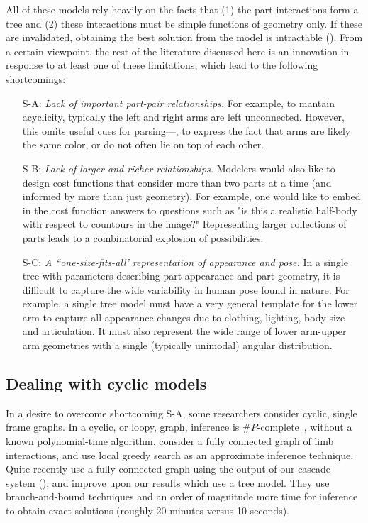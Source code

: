 All of these models rely heavily on the facts that (1) the part interactions 
form a tree and (2) these interactions must be simple functions of geometry 
only.  If these are invalidated, obtaining the best solution from the model is 
intractable ().   From a certain viewpoint, the rest of the 
literature discussed here is an innovation in response to at least one of these 
limitations, which lead to the following shortcomings:

\begin{itemize}
\item[S-A:] {\em Lack of important part-pair relationships.} For example, to 
mantain acyclicity, typically the left and right arms are left unconnected.  
However, this omits useful cues for parsing---\eg, to express the fact that 
arms are likely the same color, or do not often lie on top of each other.  

\item[S-B:] {\em Lack of larger and richer relationships.}  Modelers would also 
like to design cost functions that consider more than two parts at a time (and 
informed by more than just geometry).  For example, one would like to embed in 
the cost function answers to questions such as "is this a realistic half-body 
with respect to countours in the image?"  Representing larger collections of 
parts \naively leads to a combinatorial explosion of possibilities.

\item[S-C:] {\em A ``one-size-fits-all' representation of appearance and pose.} 
In a single tree with parameters describing part appearance and part geometry, 
it is difficult to capture the wide variability in human pose found in nature.  
For example, a single tree model must have a very general template for the 
lower arm to capture all appearance changes due to clothing, lighting, body 
size and articulation. It must also represent the wide range of lower arm-upper 
arm geometries with a single (typically unimodal) angular distribution.


\end{itemize}

\subsection{Dealing with cyclic models} In a desire to overcome shortcoming 
S-A, some researchers consider cyclic, single frame graphs.  In a cyclic, or 
loopy, graph, inference is $\#P$-complete~\citep{koller-book}, without a known 
polynomial-time algorithm.  \citet{ddtran} consider a fully connected graph of 
limb interactions, and use local greedy search as an approximate inference 
technique.  Quite recently \citet{min-bb} use a fully-connected graph using the 
output of our cascade system (), and improve  upon our results 
which use a tree model.  They use branch-and-bound techniques and an order of 
magnitude more time for inference to obtain exact solutions (roughly 20 minutes 
versus 10 seconds).

